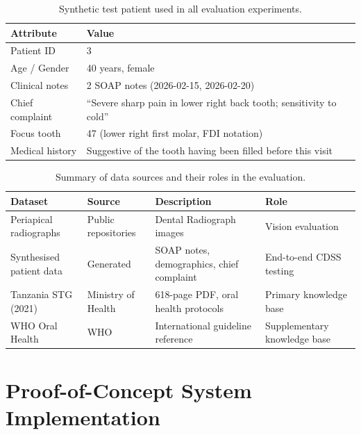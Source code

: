 \documentclass[12pt,a4paper]{report}
\begin{document}
\begin{table}[H]
\centering
\caption{Synthetic test patient used in all evaluation experiments.}
\label{tab:patient}
\small
\begin{tabular}{@{}ll@{}}
\toprule
\textbf{Attribute} & \textbf{Value} \\
\midrule
Patient ID          & 3 \\
Age / Gender        & 40 years, female \\
Clinical notes      & 2 SOAP notes (2026-02-15, 2026-02-20) \\
Chief complaint     & ``Severe sharp pain in lower right back tooth; sensitivity to cold'' \\
Focus tooth         & 47 (lower right first molar, FDI notation) \\
Medical history     & Suggestive of the tooth having been filled before this visit \\
\bottomrule
\end{tabular}
\end{table}

\begin{table}[H]
\centering
\caption{Summary of data sources and their roles in the evaluation.}
\label{tab:datasources}
\small
\renewcommand{\arraystretch}{1.2}
\begin{tabularx}{\textwidth}{@{}l l X l@{}}
\toprule
\textbf{Dataset} & \textbf{Source} & \textbf{Description} & \textbf{Role} \\
\midrule
Periapical radiographs  & Public repositories & Dental Radiograph images   & Vision evaluation \\
Synthesised patient data & Generated          & SOAP notes, demographics, chief complaint     & End-to-end CDSS testing \\
Tanzania STG (2021)     & Ministry of Health & 618-page PDF, oral health protocols & Primary knowledge base \\
WHO Oral Health         & WHO & International guideline reference         & Supplementary knowledge base \\
\bottomrule
\end{tabularx}
\end{table}

\section{Proof-of-Concept System Implementation}
\label{sec:implementation}
\end{document}
